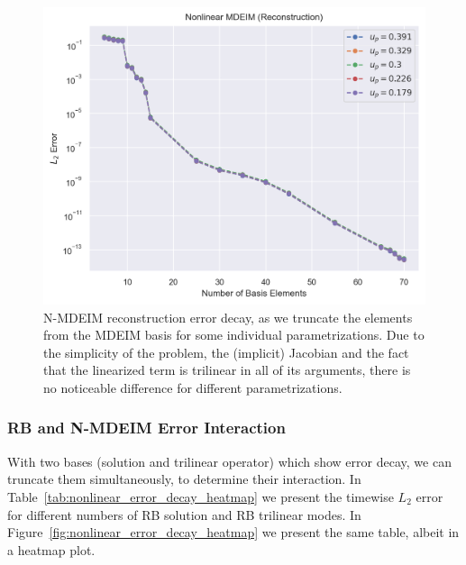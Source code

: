 \documentclass[../../thesis.tex]{subfiles}
\begin{document}
\begin{figure}[h]
    \centering
    \includegraphics[width=1\columnwidth]{research_project/piston/figures/mdeim_certification/nonlinear_error_decay_by_parameter.png}
    \caption{N-MDEIM reconstruction error decay, 
    as we truncate the elements from the MDEIM basis for some individual parametrizations.
    Due to the simplicity of the problem, 
    the (implicit) Jacobian and 
    the fact that the linearized term is trilinear in all of its arguments, 
    there is no noticeable difference for different parametrizations.}
    \label{fig:nonlinear_error_decay_from_fom_by_parameter}
\end{figure}


\subsubsection{RB and N-MDEIM Error Interaction}
\label{sec:reduced_basis_mdeim_error_interaction}
With two bases (solution and trilinear operator) which show error decay, 
we can truncate them simultaneously, 
to determine their interaction.
In Table~\ref{tab:nonlinear_error_decay_heatmap} we present 
the timewise $L_2$ error for different numbers of RB solution 
and RB trilinear modes.
In Figure~\ref{fig:nonlinear_error_decay_heatmap} we present the same table,
albeit in a heatmap plot. 
\end{document}
